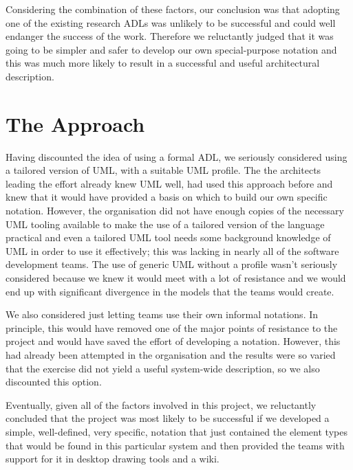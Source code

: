 Considering the combination of these factors, our conclusion was that adopting one of the existing research ADLs was unlikely to be successful and could well endanger the success of the work.  Therefore we reluctantly judged that it was going to be simpler and safer to develop our own special-purpose notation and this was much more likely to result in a successful and useful architectural description.  
  
\section{The Approach}
\label{sec:approach}

  Having discounted the idea of using a formal ADL, we seriously considered using a tailored version of UML, with a suitable UML profile.  The the architects leading the effort already knew UML well, had used this approach before and knew that it would have provided a basis on which to build our own specific notation.  However, the organisation did not have enough copies of the necessary UML tooling available to make the use of a tailored version of the language practical and even a tailored UML tool needs some background knowledge of UML in order to use it effectively; this was lacking in nearly all of the software development teams.  The use of generic UML without a profile wasn't seriously considered because we knew it would meet with a lot of resistance and we would end up with significant divergence in the models that the teams would create.

  We also considered just letting teams use their own informal notations.  In principle, this would have removed one of the major points of resistance to the project and would have saved the effort of developing a notation.  However, this had already been attempted in the organisation and the results were so varied that the exercise did not yield a useful system-wide description, so we also discounted this option.

  Eventually, given all of the factors involved in this project, we reluctantly concluded that the project was most likely to be successful if we developed a simple, well-defined, very specific, notation that just contained the element types that would be found in this particular system and then provided the teams with support for it in desktop drawing tools and a wiki.

